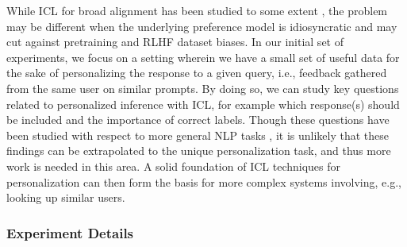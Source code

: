 While ICL for broad alignment has been studied to some extent \citep{lin2023unlockingspellbasellms}, the problem may be different when the underlying preference model is idiosyncratic and may cut against pretraining and RLHF dataset biases.
In our initial set of experiments, we focus on a setting wherein we have a small set of useful data for the sake of personalizing the response to a given query, i.e., feedback gathered from the same user on similar prompts.  
By doing so, we can study key questions related to personalized inference with ICL, for example which response(s) should be included and the importance of correct labels.  
Though these questions have been studied with respect to more general NLP tasks \citep{min2022rethinkingroledemonstrationsmakes, yoo2022groundtruthlabelsmatterdeeper, pan2023incontextlearninglearnsincontext}, it is unlikely that these findings can be extrapolated to the unique personalization task, and thus more work is needed in this area.
A solid foundation of ICL techniques for personalization can then form the basis for more complex systems involving, e.g., looking up similar users.



\subsubsection{Experiment Details}

